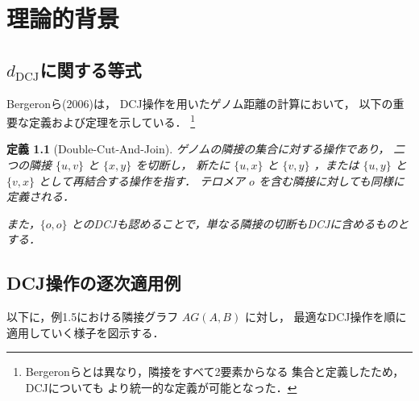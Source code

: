 \documentclass[paper=a4,fontsize=11pt,report,oneside]{jlreq}
\newtheorem{definition}[theorem]{定義}
\begin{document}





\chapter{理論的背景}

\section{$d_{\mathrm{DCJ}}$に関する等式}

Bergeronら(2006)\cite{bergeron2006}は，
DCJ操作を用いたゲノム距離の計算において，
以下の重要な定義および定理を示している．
\footnote{
Bergeronらとは異なり，隣接をすべて2要素からなる
集合と定義したため，DCJについても
より統一的な定義が可能となった．
}

\begin{definition}[Double-Cut-And-Join]
ゲノムの隣接の集合に対する操作であり，
二つの隣接 $\{u, v\}$ と $\{x, y\}$ を切断し，
新たに $\{u, x\}$ と $\{v, y\}$ ，または $\{u, y\}$ と $\{v, x\}$ として再結合する操作を指す．
テロメア $o$ を含む隣接に対しても同様に定義される．

また，$\{o, o\}$ とのDCJも認めることで，単なる隣接の切断もDCJに含めるものとする．

\end{definition}

\section{DCJ操作の逐次適用例}

以下に，例1.5における隣接グラフ $AG(A,B)$ に対し，
最適なDCJ操作を順に適用していく様子を図示する．
\end{document}
